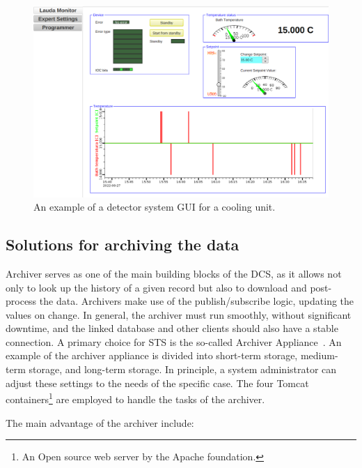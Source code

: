 \begin{figure}[!h]
\centering
\includegraphics[width=1\columnwidth]{Chapter4/images/lauda1.png}
\caption{An example of a detector system \gls{GUI} for a cooling unit.}
\label{fig_lauda1}
\end{figure}
\newpage
\subsection{Solutions for archiving the data} \label{archiver}
Archiver serves as one of the main building blocks of the \gls{DCS}, as it allows not only to look up the history of a given record but also to download and post-process the data. Archivers make use of the publish/subscribe logic, updating the values on change. In general, the archiver must run smoothly, without significant downtime, and the linked database and other clients should also have a stable connection. A primary choice for \gls{STS} is the so-called Archiver Appliance~\cite{archiver_appliance}. An example of the archiver appliance is divided into short-term storage, medium-term storage, and long-term storage. In principle, a system administrator can adjust these settings to the needs of the specific case. The  four Tomcat containers\footnote{An Open source web server by the Apache foundation.} are employed to handle the tasks of the archiver.  

The main advantage of the archiver include: 


